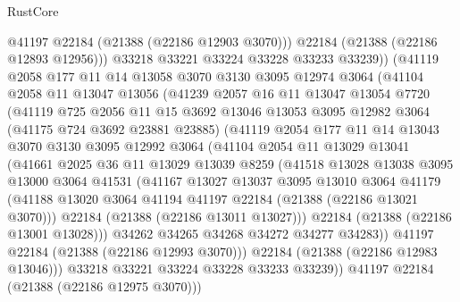 \begin{lexlean}{RustCore}
\begin{coremodule}
              @41197
              @22184
              (@21388 (@22186 @12903 @3070)))
            @22184
            (@21388 (@22186 @12893 @12956)))
          @33218
          @33221
          @33224
          @33228
          @33233
          @33239))
      (@41119
        @2058
        @177
        @11
        @14
        @13058
        @3070
        @3130
        @3095
        @12974
        @3064
        (@41104
          @2058
          @11
          @13047
          @13056
          (@41239
            @2057
            @16
            @11
            @13047
            @13054
            @7720
            (@41119
              @725
              @2056
              @11
              @15
              @3692
              @13046
              @13053
              @3095
              @12982
              @3064
              (@41175 @724 @3692 @23881 @23885)
              (@41119
                @2054
                @177
                @11
                @14
                @13043
                @3070
                @3130
                @3095
                @12992
                @3064
                (@41104
                  @2054
                  @11
                  @13029
                  @13041
                  (@41661
                    @2025
                    @36
                    @11
                    @13029
                    @13039
                    @8259
                    (@41518
                      @13028
                      @13038
                      @3095
                      @13000
                      @3064
                      @41531
                      (@41167
                        @13027
                        @13037
                        @3095
                        @13010
                        @3064
                        @41179
                        (@41188 @13020 @3064 @41194 @41197 @22184 (@21388 (@22186 @13021 @3070)))
                        @22184
                        (@21388 (@22186 @13011 @13027)))
                      @22184
                      (@21388 (@22186 @13001 @13028)))
                    @34262
                    @34265
                    @34268
                    @34272
                    @34277
                    @34283))
                @41197
                @22184
                (@21388 (@22186 @12993 @3070)))
              @22184
              (@21388 (@22186 @12983 @13046)))
            @33218
            @33221
            @33224
            @33228
            @33233
            @33239))
        @41197
        @22184
        (@21388 (@22186 @12975 @3070)))

\end{coremodule}
\end{lexlean}
